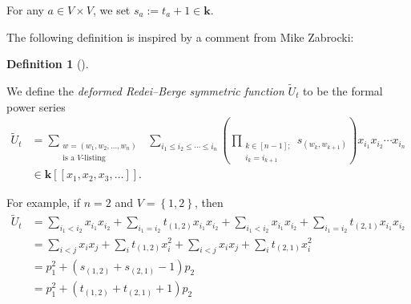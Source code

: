 \documentclass[numbers=enddot,12pt,final,onecolumn,notitlepage]{scrartcl}%
\numberwithin{exer}{section}
\theoremstyle{definition}
\newtheorem{defi}[theo]{Definition}
\newenvironment{definition}[1][]
{\begin{defi}[#1]\begin{leftbar}}
{\end{leftbar}\end{defi}}
\let\sumnonlimits\sum
\let\prodnonlimits\prod
\renewcommand{\sum}{\sumnonlimits\limits}
\renewcommand{\prod}{\prodnonlimits\limits}
\begin{document}
For any $a\in V\times V$, we set $s_{a}:=t_{a}+1\in\mathbf{k}$.

The following definition is inspired by a comment from Mike Zabrocki:

\begin{definition}
We define the \emph{deformed Redei--Berge symmetric function} $\widetilde{U}%
_{t}$ to be the formal power series%
\begin{align*}
\widetilde{U}_{t}  &  =\sum_{\substack{w=\left(  w_{1},w_{2},\ldots
,w_{n}\right)  \\\text{is a }V\text{-listing}}}\ \ \sum_{i_{1}\leq i_{2}%
\leq\cdots\leq i_{n}}\left(  \prod_{\substack{k\in\left[  n-1\right]
;\\i_{k}=i_{k+1}}}s_{\left(  w_{k},w_{k+1}\right)  }\right)  x_{i_{1}}%
x_{i_{2}}\cdots x_{i_{n}}\\
&  \in\mathbf{k}\left[  \left[  x_{1},x_{2},x_{3},\ldots\right]  \right]  .
\end{align*}

\end{definition}

For example, if $n=2$ and $V=\left\{  1,2\right\}  $, then%
\begin{align*}
\widetilde{U}_{t}  &  =\sum_{i_{1}<i_{2}}x_{i_{1}}x_{i_{2}}+\sum_{i_{1}=i_{2}%
}t_{\left(  1,2\right)  }x_{i_{1}}x_{i_{2}}+\sum_{i_{1}<i_{2}}x_{i_{1}%
}x_{i_{2}}+\sum_{i_{1}=i_{2}}t_{\left(  2,1\right)  }x_{i_{1}}x_{i_{2}}\\
&  =\sum_{i<j}x_{i}x_{j}+\sum_{i}t_{\left(  1,2\right)  }x_{i}^{2}+\sum
_{i<j}x_{i}x_{j}+\sum_{i}t_{\left(  2,1\right)  }x_{i}^{2}\\
&  =p_{1}^{2}+\left(  s_{\left(  1,2\right)  }+s_{\left(  2,1\right)
}-1\right)  p_{2}\\
&  =p_{1}^{2}+\left(  t_{\left(  1,2\right)  }+t_{\left(  2,1\right)
}+1\right)  p_{2}%
\end{align*}
\end{document}
